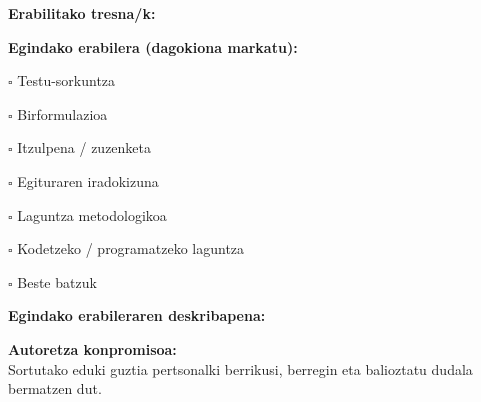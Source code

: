 \noindent\textbf{Erabilitako tresna/k:}


\vspace{2em}
\noindent\textbf{Egindako erabilera (dagokiona markatu):}

$\square$ Testu-sorkuntza

$\square$ Birformulazioa

$\square$ Itzulpena / zuzenketa

$\square$ Egituraren iradokizuna

$\square$ Laguntza metodologikoa

$\square$ Kodetzeko / programatzeko laguntza

$\square$ Beste batzuk


\vspace{1em}
\noindent\textbf{Egindako erabileraren deskribapena:}





\vspace{3em}
\noindent\textbf{Autoretza konpromisoa:}\\
Sortutako eduki guztia pertsonalki berrikusi, berregin eta balioztatu dudala bermatzen dut.

